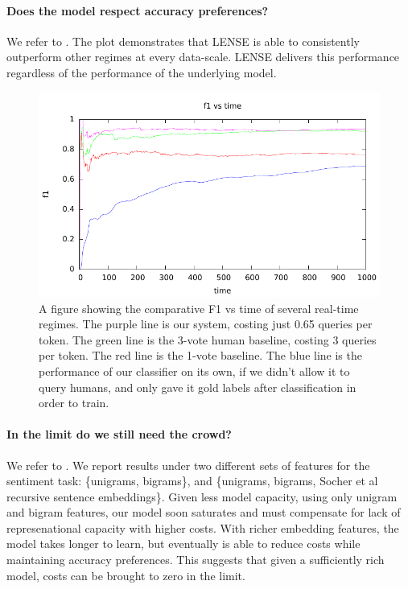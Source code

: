 \paragraph{Does the model respect accuracy preferences?} 
We refer to .
The plot demonstrates that LENSE is able to consistently outperform other regimes at every data-scale.
LENSE delivers this performance regardless of the performance of the underlying model.

\begin{figure}[t]
  \begin{centering}
  \includegraphics[width=1.0\textwidth]{figures/ner_2_class/f1_plot/f1_vs_time.pdf}
  \end{centering}
  \caption{A figure showing the comparative F1 vs time of several real-time regimes. The purple line is our system, costing just 0.65 queries per token. The green line is the 3-vote human baseline, costing 3 queries per token. The red line is the 1-vote baseline. The blue line is the performance of our classifier on its own, if we didn't allow it to query humans, and only gave it gold labels after classification in order to train.}
\label{fig:ner-running-f1}
\end{figure}

\paragraph{In the limit do we still need the crowd?}
We refer to .
We report results under two different sets of features for the sentiment task: \{unigrams, bigrams\}, and \{unigrams, bigrams, Socher et al recursive sentence embeddings\}.
Given less model capacity, using only unigram and bigram features, our model soon saturates and must compensate for lack of represenational capacity with higher costs.
With richer embedding features, the model takes longer to learn, but eventually is able to reduce costs while maintaining accuracy preferences.
This suggests that given a sufficiently rich model, costs can be brought to zero in the limit.

